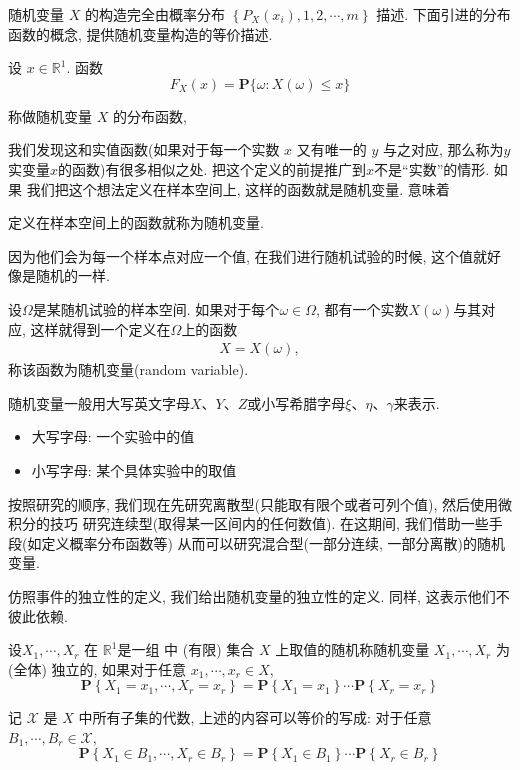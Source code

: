 随机变量 $X$ 的构造完全由概率分布 $\left\{P_{X}\left(x_i\right), 1,2, \cdots, m\right\}$ 描述. 下面引进的分布函数的概念, 提供随机变量构造的等价描述.

\begin{definition*}
    设 $x \in \mathbb{R}^1$. 函数
$$
F_{X}(x)=\mathbf{P}\{\omega: X(\omega) \leqslant x\}
$$

称做随机变量 $X$ 的分布函数,
\end{definition*}

我们发现这和实值函数(如果对于每一个实数 $x$ 又有唯一的 $y$ 与之对应,
那么称为$y$ 实变量$x$的函数)有很多相似之处. 把这个定义的前提推广到$x$不是``实数''的情形. 如果
我们把这个想法定义在样本空间上, 这样的函数就是随机变量. 意味着

\begin{definition*}
    定义在样本空间上的函数就称为随机变量.
\end{definition*}

因为他们会为每一个样本点对应一个值, 在我们进行随机试验的时候, 这个值就好像是随机的一样.

\begin{definition}[随机变量]
    设$\Omega$是某随机试验的样本空间. 如果对于每个$\omega\in\Omega$, 都有一个实数$X(\omega)$与其对应, 这样就得到一个定义在$\Omega$上的函数
    \begin{align*}
        X=X(\omega),
    \end{align*}
    称该函数为随机变量(random variable).
\end{definition}

随机变量一般用大写英文字母$X$、$Y$、$Z$或小写希腊字母$\xi$、$\eta$、$\gamma$来表示. 
\begin{itemize}
    \item 大写字母: 一个实验中的值
    \item 小写字母: 某个具体实验中的取值
\end{itemize}

按照研究的顺序, 我们现在先研究离散型(只能取有限个或者可列个值), 然后使用微积分的技巧
研究连续型(取得某一区间内的任何数值). 在这期间, 我们借助一些手段(如定义概率分布函数等)
从而可以研究混合型(一部分连续, 一部分离散)的随机变量.




仿照事件的独立性的定义, 我们给出随机变量的独立性的定义. 同样, 这表示他们不彼此依赖. 

\begin{definition}
    设$X_1, \cdots, X_r$ 在 $\mathbb{R}^1$是一组  中 (有限) 集合 $X$ 上取值的随机称随机变量 $X_1, \cdots, X_r$ 为 (全体) 独立的, 如果对于任意 $x_1, \cdots, x_r \in X$,
$$
\mathbf{P}\left\{X_1=x_1, \cdots, X_r=x_r\right\}=\mathbf{P}\left\{X_1=x_1\right\} \cdots \mathbf{P}\left\{X_r=x_r\right\}
$$
\end{definition}

\begin{shaded}
    记 $\mathscr{X}$ 是 $X$ 中所有子集的代数, 上述的内容可以等价的写成: 对于任意 $B_1, \cdots, B_r \in \mathscr{X}$,
    $$
    \mathbf{P}\left\{X_1 \in B_1, \cdots, X_r \in B_r\right\}=\mathbf{P}\left\{X_1 \in B_1\right\} \cdots \mathbf{P}\left\{X_r \in B_r\right\}
    $$
\end{shaded}